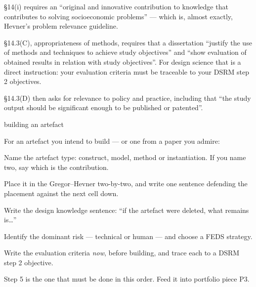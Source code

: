 \begin{regbox}
\S14(i) requires an ``original and innovative contribution to knowledge that
contributes to solving socioeconomic problems'' --- which is, almost exactly,
Hevner's problem relevance guideline.

\medskip
\S14.3(C), appropriateness of methods, requires that a dissertation ``justify
the use of methods and techniques to achieve study objectives'' and ``show
evaluation of obtained results in relation with study objectives''. For design
science that is a direct instruction: your evaluation criteria must be
traceable to your DSRM step 2 objectives.

\medskip
\S14.3(D) then asks for relevance to policy and practice, including that ``the
study output should be significant enough to be published or patented''.
\end{regbox}

\begin{traditions}{building an artefact}
\end{traditions}

\begin{lab}
For an artefact you intend to build --- or one from a paper you admire:

\begin{tightnum}
  \item Name the artefact type: construct, model, method or instantiation. If
    you name two, say which is the contribution.
  \item Place it in the Gregor--Hevner two-by-two, and write one sentence
    defending the placement against the next cell down.
  \item Write the design knowledge sentence: ``if the artefact were deleted,
    what remains is\ldots''
  \item Identify the dominant risk --- technical or human --- and choose a FEDS
    strategy.
  \item Write the evaluation criteria \emph{now}, before building, and trace
    each to a DSRM step 2 objective.
\end{tightnum}

\medskip
Step 5 is the one that must be done in this order. Feed it into portfolio piece
P3.
\end{lab}

